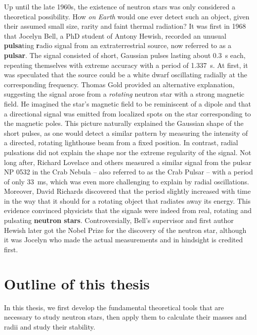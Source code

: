 Up until the late 1960s, the existence of neutron stars was only considered a theoretical possibility.
How \emph{on Earth} would one ever detect such an object, given their assumed small size, rarity and faint thermal radiation?
It was first in 1968 that Jocelyn Bell, a PhD student of Antony Hewish, recorded an unusual \textbf{pulsa}ting \textbf{r}adio signal from an extraterrestrial source, now referred to as a \textbf{pulsar}. \cite{ref:neutron_star_discovery_first}
The signal consisted of short, Gaussian pulses lasting about \SI{0.3}{\second} each, repeating themselves with extreme accuracy with a period of \SI{1.337}{\second}.
At first, it was speculated that the source could be a white dwarf oscillating radially at the corresponding frequency.
Thomas Gold provided an alternative explanation, suggesting the signal arose from a \emph{rotating} neutron star with a strong magnetic field. \cite{ref:neutron_star_gold}
He imagined the star's magnetic field to be reminiscent of a dipole and that a directional signal was emitted from localized spots on the star corresponding to the magnetic poles.
This picture naturally explained the Gaussian shape of the short pulses, as one would detect a similar pattern by measuring the intensity of a directed, rotating lighthouse beam from a fixed position.
In contrast, radial pulsations did not explain the shape nor the extreme regularity of the signal.
Not long after, Richard Lovelace and others measured a similar signal from the pulsar NP 0532 in the Crab Nebula -- also referred to as the Crab Pulsar -- with a period of only \SI{33}{\milli\second}, which was even more challenging to explain by radial oscillations. \cite{ref:crab_pulsar_period_discovery}
Moreover, David Richards discovered that the period slightly increased with time in the way that it should for a rotating object that radiates away its energy.
This evidence convinced physicists that the signals were indeed from real, rotating and pulsating \textbf{neutron stars}.
Controversially, Bell's supervisor and first author Hewish later got the Nobel Prize for the discovery of the neutron star, although it was Jocelyn who made the actual measurements and in hindsight is credited first.


\section{Outline of this thesis}

In this thesis, we first develop the fundamental theoretical tools that are necessary to study neutron stars, then apply them to calculate their masses and radii and study their stability.

